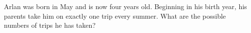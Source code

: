 Arlan was born in May and is now four years old. Beginning in his birth year, his parents take him on exactly one trip every summer. What are the possible numbers of trips he has taken?
